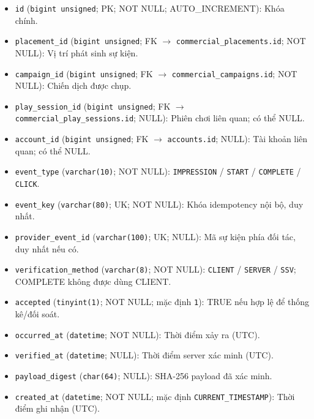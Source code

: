 \begin{itemize}

\item \texttt{id} (\texttt{bigint unsigned}; PK; NOT NULL; AUTO_INCREMENT): Khóa chính.

\item \texttt{placement\_id} (\texttt{bigint unsigned}; FK $\rightarrow$ \texttt{commercial\_placements.id}; NOT NULL): Vị trí phát sinh sự kiện.

\item \texttt{campaign\_id} (\texttt{bigint unsigned}; FK $\rightarrow$ \texttt{commercial\_campaigns.id}; NOT NULL): Chiến dịch được chụp.

\item \texttt{play\_session\_id} (\texttt{bigint unsigned}; FK $\rightarrow$ \texttt{commercial\_play\_sessions.id}; NULL): Phiên chơi liên quan; có thể NULL.

\item \texttt{account\_id} (\texttt{bigint unsigned}; FK $\rightarrow$ \texttt{accounts.id}; NULL): Tài khoản liên quan; có thể NULL.

\item \texttt{event\_type} (\texttt{varchar(10)}; NOT NULL): \texttt{IMPRESSION} / \texttt{START} / \texttt{COMPLETE} / \texttt{CLICK}.

\item \texttt{event\_key} (\texttt{varchar(80)}; UK; NOT NULL): Khóa idempotency nội bộ, duy nhất.

\item \texttt{provider\_event\_id} (\texttt{varchar(100)}; UK; NULL): Mã sự kiện phía đối tác, duy nhất nếu có.

\item \texttt{verification\_method} (\texttt{varchar(8)}; NOT NULL): \texttt{CLIENT} / \texttt{SERVER} / \texttt{SSV}; COMPLETE không được dùng CLIENT.

\item \texttt{accepted} (\texttt{tinyint(1)}; NOT NULL; mặc định \texttt{1}): TRUE nếu hợp lệ để thống kê/đối soát.

\item \texttt{occurred\_at} (\texttt{datetime}; NOT NULL): Thời điểm xảy ra (UTC).

\item \texttt{verified\_at} (\texttt{datetime}; NULL): Thời điểm server xác minh (UTC).

\item \texttt{payload\_digest} (\texttt{char(64)}; NULL): SHA-256 payload đã xác minh.

\item \texttt{created\_at} (\texttt{datetime}; NOT NULL; mặc định \texttt{CURRENT\_TIMESTAMP}): Thời điểm ghi nhận (UTC).

\end{itemize}

